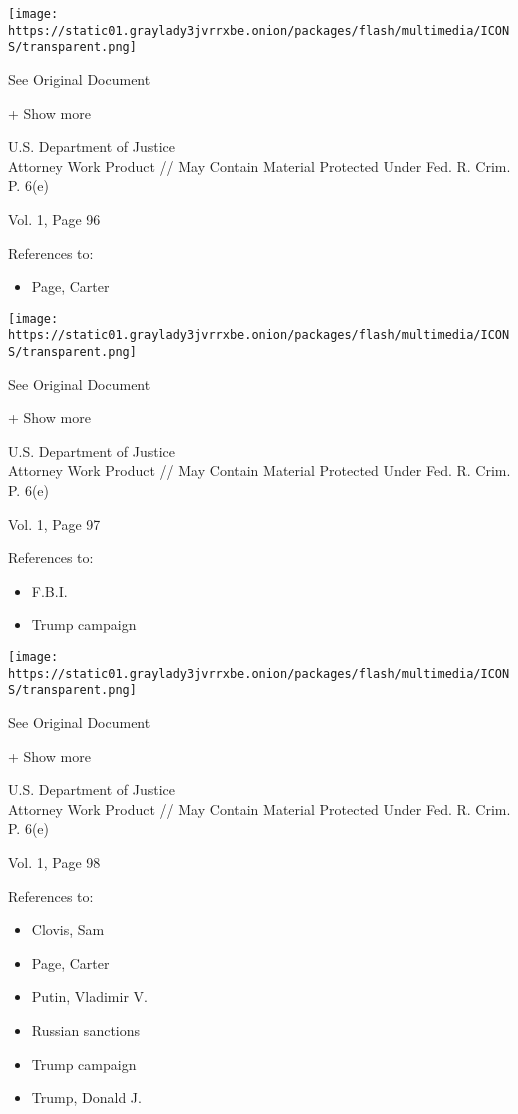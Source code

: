 \protect\hyperlink{}{}

\texttt{[image: https://static01.graylady3jvrrxbe.onion/packages/flash/multimedia/ICONS/transparent.png]}

See Original Document

+ Show more

U.S. Department of Justice\\
Attorney Work Product // May Contain Material Protected Under Fed. R.
Crim. P. 6(e)

Vol. 1, Page 96

References to:

\begin{itemize}
\tightlist
\item
  Page, Carter
\end{itemize}

\protect\hyperlink{}{}

\texttt{[image: https://static01.graylady3jvrrxbe.onion/packages/flash/multimedia/ICONS/transparent.png]}

See Original Document

+ Show more

U.S. Department of Justice\\
Attorney Work Product // May Contain Material Protected Under Fed. R.
Crim. P. 6(e)

Vol. 1, Page 97

References to:

\begin{itemize}
\tightlist
\item
  F.B.I.
\item
  Trump campaign
\end{itemize}

\protect\hyperlink{}{}

\texttt{[image: https://static01.graylady3jvrrxbe.onion/packages/flash/multimedia/ICONS/transparent.png]}

See Original Document

+ Show more

U.S. Department of Justice\\
Attorney Work Product // May Contain Material Protected Under Fed. R.
Crim. P. 6(e)

Vol. 1, Page 98

References to:

\begin{itemize}
\tightlist
\item
  Clovis, Sam
\item
  Page, Carter
\item
  Putin, Vladimir V.
\item
  Russian sanctions
\item
  Trump campaign
\item
  Trump, Donald J.
\end{itemize}

